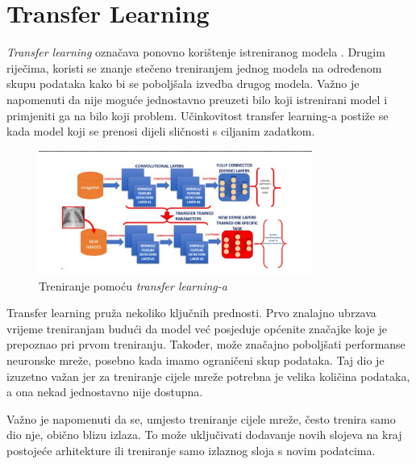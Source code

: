 
\chapter{Transfer Learning}\label{ch:transfer-learning}

\emph{Transfer learning} označava ponovno korištenje istreniranog modela .
Drugim riječima, koristi se znanje stečeno treniranjem jednog modela na određenom skupu podataka kako bi se poboljšala izvedba drugog modela.
Važno je napomenuti da nije moguće jednostavno preuzeti bilo koji istrenirani model i primjeniti ga na bilo koji problem.
Učinkovitost transfer learning-a postiže se kada model koji se prenosi dijeli sličnosti s ciljanim zadatkom.

\FloatBarrier
\begin{figure}[h]
    \centering
    \includegraphics[width=0.8\textwidth]{images/Transfer-learning}
    \caption{Treniranje pomoću \emph{transfer learning-a}}
    \label{fig:slika17}
\end{figure}
\FloatBarrier

Transfer learning pruža nekoliko ključnih prednosti.
Prvo znalajno ubrzava vrijeme treniranjam budući da model već posjeduje općenite značajke koje je prepoznao pri prvom treniranju.
Također, može značajno poboljšati performanse neuronske mreže, posebno kada imamo ograničeni skup podataka.
Taj dio je izuzetno važan jer za treniranje cijele mreže potrebna je velika količina podataka, a ona nekad jednostavno nije dostupna.

Važno je napomenuti da se, umjesto treniranje cijele mreže, često trenira samo dio nje, obično blizu izlaza.
To može uključivati dodavanje novih slojeva na kraj postojeće arhitekture ili treniranje samo izlaznog sloja s novim podatcima.
